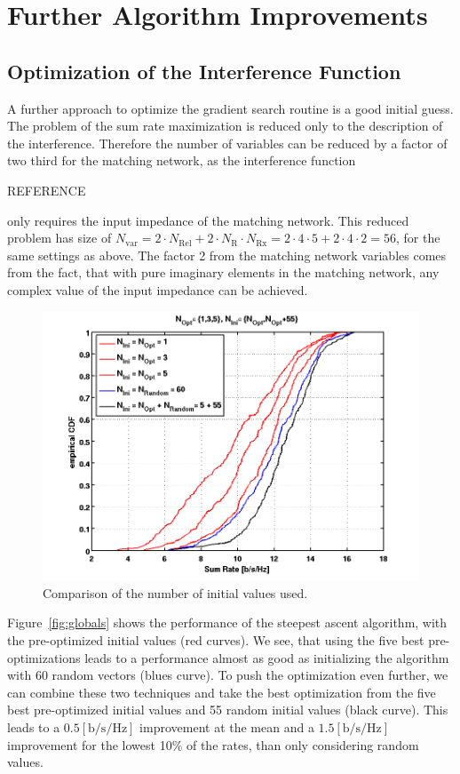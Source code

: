 \section{Further Algorithm Improvements}

\subsection{Optimization of the Interference Function}

A further approach to optimize the gradient search routine is a good initial guess.
The problem of the sum rate maximization is reduced only to the description of the interference.
Therefore the number of variables can be reduced by a factor of two third for the matching network, as the interference function

REFERENCE

only requires the input impedance of the matching network.
This reduced problem has size of $N_\text{var} =  2\cdot N_\text{Rel}+2\cdot N_\text{R}\cdot N_\text{Rx} = 2\cdot 4\cdot 5 + 2\cdot 4\cdot 2 = 56$, for the same settings as above.
The factor 2 from the matching network variables comes from the fact, that with pure imaginary elements in the matching network, any complex value of the input impedance can be achieved.

\begin{figure}[h]
\centering
  \includegraphics[width=0.8\linewidth]{images/Inioptcomparison_edited.png}
\caption{Comparison of the number of initial values used.}
\label{fig:ini_comp}
\end{figure}

Figure~\ref{fig:globals} shows the performance of the steepest ascent algorithm, with the pre-optimized initial values (red curves).
We see, that using the five best pre-optimizations leads to a performance almost as good as initializing the algorithm with 60 random vectors (blues curve).
To push the optimization even further, we can combine these two techniques and take the best optimization from the five best pre-optimized initial values and 55 random initial values (black curve).
This leads to a $0.5 \left[\text{b/s/Hz}\right]$ improvement at the mean and a $1.5 \left[\text{b/s/Hz}\right]$ improvement for the lowest 10\% of the rates, than only considering random values.



